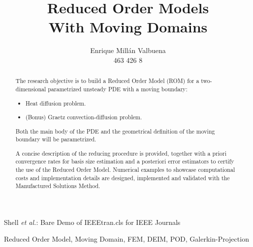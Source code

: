 \documentclass[a4paper, technote, compsoc]{IEEEtran}
\begin{document}
\title{Reduced Order Models \\ With Moving Domains}

\author{Enrique Millán Valbuena \\ \normalsize{463 426 8}}%
        
{Shell \MakeLowercase{\textit{et al.}}: Bare Demo of IEEEtran.cls for IEEE Journals}

\maketitle

\begin{abstract}
   The research objective is to build a Reduced Order Model (ROM) for a two-dimensional parametrized unsteady PDE with a moving boundary:
   \begin{itemize}
      \item Heat diffusion problem.
      \item (Bonus) Graetz convection-diffusion problem.
   \end{itemize}
   Both the main body of the PDE and the geometrical definition of the moving boundary will be parametrized.

   A concise description of the reducing procedure is provided, together with a priori convergence rates for basis size estimation and a posteriori error estimators to certify the use of the Reduced Order Model.
   Numerical examples to showcase computational costs and implementation details are designed, implemented and validated with the Manufactured Solutions Method. 
\end{abstract}

\begin{IEEEkeywords}
    Reduced Order Model, Moving Domain, FEM, DEIM, POD, Galerkin-Projection
\end{IEEEkeywords}
    

% 

% 
% 

\end{document}
